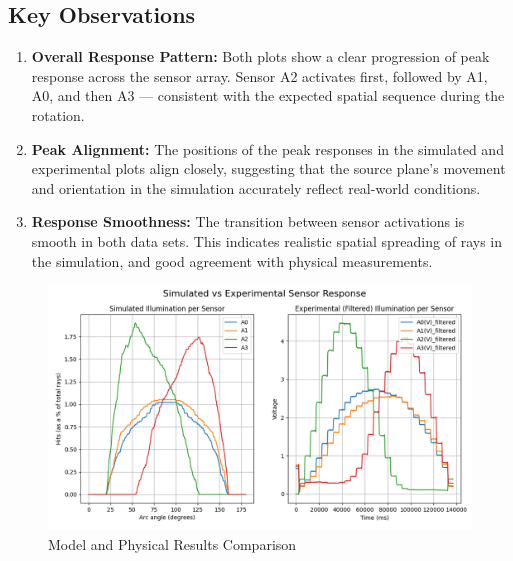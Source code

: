 \subsection*{Key Observations}
\begin{enumerate}
    \item \textbf{Overall Response Pattern:} Both plots show a clear progression of peak response across the sensor array. Sensor A2 activates first, followed by A1, A0, and then A3 — consistent with the expected spatial sequence during the rotation.
    
    \item \textbf{Peak Alignment:} The positions of the peak responses in the simulated and experimental plots align closely, suggesting that the source plane's movement and orientation in the simulation accurately reflect real-world conditions.
    
    \item \textbf{Response Smoothness:} The transition between sensor activations is smooth in both data sets. This indicates realistic spatial spreading of rays in the simulation, and good agreement with physical measurements.
\end{enumerate}
 \begin{landscape}
    \begin{figure}[htbp] %
        \centering
        \includegraphics[width=1.4\textwidth]{chapters/results/images/Comparison_plot.png} %
        \caption{Model and Physical Results Comparison}       %
        \label{fig:Model and Physical Results Comparison}            %
    \end{figure}
 \end{landscape}

